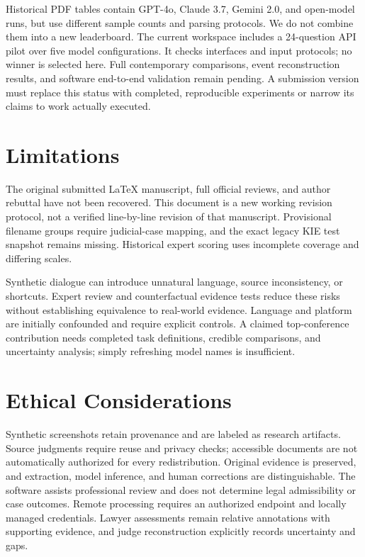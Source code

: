 \documentclass[11pt]{article}
\begin{document}
Historical PDF tables contain GPT-4o, Claude 3.7, Gemini 2.0, and open-model runs, but use different sample counts and parsing protocols. We do not combine them into a new leaderboard. The current workspace includes a 24-question API pilot over five model configurations. It checks interfaces and input protocols; no winner is selected here. Full contemporary comparisons, event reconstruction results, and software end-to-end validation remain pending. A submission version must replace this status with completed, reproducible experiments or narrow its claims to work actually executed.

\section{Limitations}
The original submitted LaTeX manuscript, full official reviews, and author rebuttal have not been recovered. This document is a new working revision protocol, not a verified line-by-line revision of that manuscript. Provisional filename groups require judicial-case mapping, and the exact legacy KIE test snapshot remains missing. Historical expert scoring uses incomplete coverage and differing scales.

Synthetic dialogue can introduce unnatural language, source inconsistency, or shortcuts. Expert review and counterfactual evidence tests reduce these risks without establishing equivalence to real-world evidence. Language and platform are initially confounded and require explicit controls. A claimed top-conference contribution needs completed task definitions, credible comparisons, and uncertainty analysis; simply refreshing model names is insufficient.

\section{Ethical Considerations}
Synthetic screenshots retain provenance and are labeled as research artifacts. Source judgments require reuse and privacy checks; accessible documents are not automatically authorized for every redistribution. Original evidence is preserved, and extraction, model inference, and human corrections are distinguishable. The software assists professional review and does not determine legal admissibility or case outcomes. Remote processing requires an authorized endpoint and locally managed credentials. Lawyer assessments remain relative annotations with supporting evidence, and judge reconstruction explicitly records uncertainty and gaps.


\end{document}
